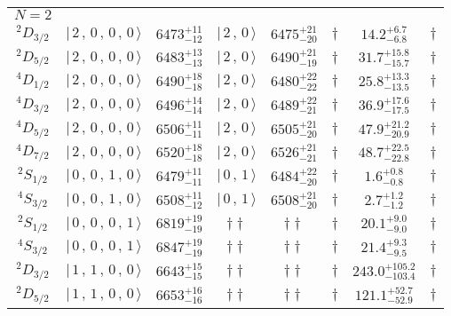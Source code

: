 \begin{tabular}{c| c c c c c c c}
\hline
 $N=2$  &  &  &  &  &  \\ 
$^{2}D_{3/2}$ & $\vert \,2\,,\,0\,,\,0\,,\,0 \,\rangle $ & $6473^{+11}_{-12}$ & $\vert \,2\,,\,0 \,\rangle$ & $6475^{+21}_{-20}$ & $\dagger$ & $14.2^{+6.7}_{-6.8}$ & $\dagger$ \\ 
$^{2}D_{5/2}$ & $\vert \,2\,,\,0\,,\,0\,,\,0 \,\rangle $ & $6483^{+13}_{-13}$ & $\vert \,2\,,\,0 \,\rangle$ & $6490^{+21}_{-19}$ & $\dagger$ & $31.7^{+15.8}_{-15.7}$ & $\dagger$ \\ 
$^{4}D_{1/2}$ & $\vert \,2\,,\,0\,,\,0\,,\,0 \,\rangle $ & $6490^{+18}_{-18}$ & $\vert \,2\,,\,0 \,\rangle$ & $6480^{+22}_{-22}$ & $\dagger$ & $25.8^{+13.3}_{-13.5}$ & $\dagger$ \\ 
$^{4}D_{3/2}$ & $\vert \,2\,,\,0\,,\,0\,,\,0 \,\rangle $ & $6496^{+14}_{-14}$ & $\vert \,2\,,\,0 \,\rangle$ & $6489^{+22}_{-21}$ & $\dagger$ & $36.9^{+17.6}_{-17.5}$ & $\dagger$ \\ 
$^{4}D_{5/2}$ & $\vert \,2\,,\,0\,,\,0\,,\,0 \,\rangle $ & $6506^{+11}_{-11}$ & $\vert \,2\,,\,0 \,\rangle$ & $6505^{+21}_{-20}$ & $\dagger$ & $47.9^{+21.2}_{-20.9}$ & $\dagger$ \\ 
$^{4}D_{7/2}$ & $\vert \,2\,,\,0\,,\,0\,,\,0 \,\rangle $ & $6520^{+18}_{-18}$ & $\vert \,2\,,\,0 \,\rangle$ & $6526^{+21}_{-21}$ & $\dagger$ & $48.7^{+22.5}_{-22.8}$ & $\dagger$ \\ 
$^{2}S_{1/2}$ & $\vert \,0\,,\,0\,,\,1\,,\,0 \,\rangle $ & $6479^{+11}_{-11}$ & $\vert \,0\,,\,1 \,\rangle$ & $6484^{+22}_{-20}$ & $\dagger$ & $1.6^{+0.8}_{-0.8}$ & $\dagger$ \\ 
$^{4}S_{3/2}$ & $\vert \,0\,,\,0\,,\,1\,,\,0 \,\rangle $ & $6508^{+11}_{-12}$ & $\vert \,0\,,\,1 \,\rangle$ & $6508^{+21}_{-20}$ & $\dagger$ & $2.7^{+1.2}_{-1.2}$ & $\dagger$ \\ 
$^{2}S_{1/2}$ & $\vert \,0\,,\,0\,,\,0\,,\,1 \,\rangle $ & $6819^{+19}_{-19}$ & $\dagger\dagger$ & $\dagger\dagger$ & $\dagger$ & $20.1^{+9.0}_{-9.0}$ & $\dagger$ \\ 
$^{4}S_{3/2}$ & $\vert \,0\,,\,0\,,\,0\,,\,1 \,\rangle $ & $6847^{+19}_{-19}$ & $\dagger\dagger$ & $\dagger\dagger$ & $\dagger$ & $21.4^{+9.3}_{-9.5}$ & $\dagger$ \\ 
$^{2}D_{3/2}$ & $\vert \,1\,,\,1\,,\,0\,,\,0 \,\rangle $ & $6643^{+15}_{-15}$ & $\dagger\dagger$ & $\dagger\dagger$ & $\dagger$ & $243.0^{+105.2}_{-103.4}$ & $\dagger$ \\ 
$^{2}D_{5/2}$ & $\vert \,1\,,\,1\,,\,0\,,\,0 \,\rangle $ & $6653^{+16}_{-16}$ & $\dagger\dagger$ & $\dagger\dagger$ & $\dagger$ & $121.1^{+52.7}_{-52.9}$ & $\dagger$ \\ 

\end{tabular}
